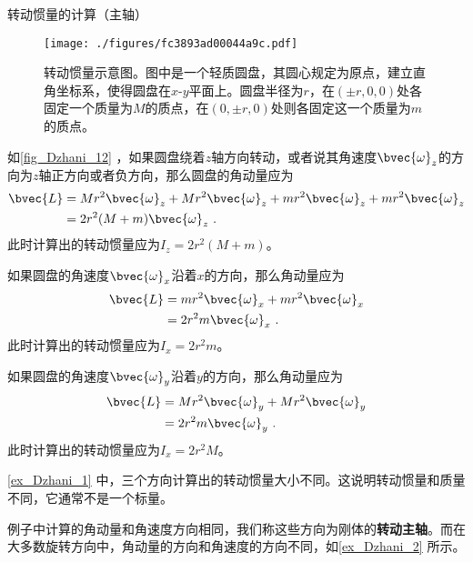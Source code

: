 \begin{example}{转动惯量的计算（主轴）}\label{ex_Dzhani_1}


\begin{figure}[ht]
\centering
\texttt{[image: ./figures/fc3893ad00044a9c.pdf]}
\caption{转动惯量示意图。图中是一个轻质圆盘，其圆心规定为原点，建立直角坐标系，使得圆盘在$x$-$y$平面上。圆盘半径为$r$，在$(\pm r, 0, 0)$处各固定一个质量为$M$的质点，在$(0, \pm r, 0)$处则各固定这一个质量为$m$的质点。} \label{fig_Dzhani_12}
\end{figure}


如\autoref{fig_Dzhani_12} ，如果圆盘绕着$z$轴方向转动，或者说其角速度$\bvec{\omega}_z$的方向为$z$轴正方向或者负方向，那么圆盘的角动量应为
\begin{equation}
\begin{aligned}
\bvec{L} ={}& Mr^2\bvec{\omega}_z+Mr^2\bvec{\omega}_z+mr^2\bvec{\omega}_z+mr^2\bvec{\omega}_z\\
={}& 2r^2(M+m)\bvec{\omega}_z ~.
\end{aligned}
\end{equation}
此时计算出的转动惯量应为$I_z=2r^2(M+m)$。

如果圆盘的角速度$\bvec{\omega}_x$沿着$x$的方向，那么角动量应为
\begin{equation}
\begin{aligned}
\bvec{L} ={}& mr^2\bvec{\omega}_x+mr^2\bvec{\omega}_x\\
={}& 2r^2m\bvec{\omega}_x ~.
\end{aligned}
\end{equation}
此时计算出的转动惯量应为$I_x=2r^2m$。

如果圆盘的角速度$\bvec{\omega}_y$沿着$y$的方向，那么角动量应为
\begin{equation}
\begin{aligned}
\bvec{L} ={}& Mr^2\bvec{\omega}_y+Mr^2\bvec{\omega}_y\\
={}& 2r^2m\bvec{\omega}_y ~.
\end{aligned}
\end{equation}
此时计算出的转动惯量应为$I_x=2r^2M$。




\end{example}



\autoref{ex_Dzhani_1} 中，三个方向计算出的转动惯量大小不同。这说明转动惯量和质量不同，它通常不是一个标量。


例子中计算的角动量和角速度方向相同，我们称这些方向为刚体的\textbf{转动主轴}。而在大多数旋转方向中，角动量的方向和角速度的方向不同，如\autoref{ex_Dzhani_2} 所示。


